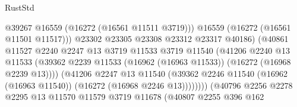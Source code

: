 \begin{lexlean}{RustStd}
\begin{coremodule}
                                              @39267
                                              @16559
                                              (@16272 (@16561 @11511 @3719)))
                                            @16559
                                            (@16272 (@16561 @11501 @11517)))
                                          @23302
                                          @23305
                                          @23308
                                          @23312
                                          @23317
                                          @40186)
                                        (@40861
                                          @11527
                                          @2240
                                          @2247
                                          @13
                                          @3719
                                          @11533
                                          @3719
                                          @11540
                                          (@41206
                                            @2240
                                            @13
                                            @11533
                                            (@39362
                                              @2239
                                              @11533
                                              (@16962 (@16963 @11533))
                                              (@16272 (@16968 @2239 @13))))
                                          (@41206
                                            @2247
                                            @13
                                            @11540
                                            (@39362
                                              @2246
                                              @11540
                                              (@16962 (@16963 @11540))
                                              (@16272 (@16968 @2246 @13))))))))
                                  (@40796
                                    @2256
                                    @2278
                                    @2295
                                    @13
                                    @11570
                                    @11579
                                    @3719
                                    @11678
                                    (@40807
                                      @2255
                                      @396
                                      @162

\end{coremodule}
\end{lexlean}
